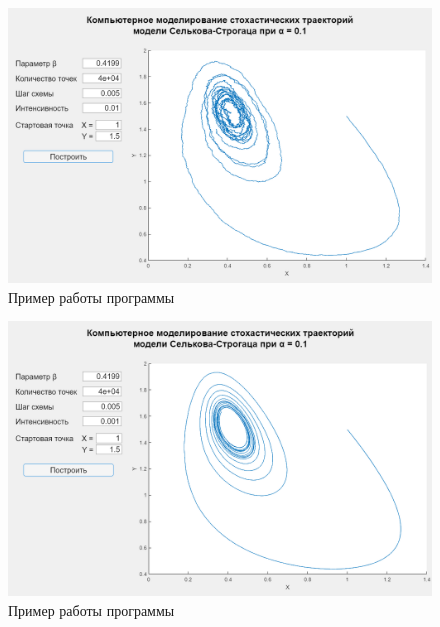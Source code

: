 \documentclass[a4paper, 14pt]{article}
\begin{document}
			\begin{figure}[!ht]
				\begin{center}
					\includegraphics[scale=0.35]{img/ex1.png}\caption{Пример работы программы}
				\end{center}
			\end{figure}
		
			\newpage
			
			\begin{figure}[!ht]
				\begin{center}
					\includegraphics[scale=0.35]{img/ex2.png}\caption{Пример работы программы}
				\end{center}
			\end{figure}
			
\end{document}
